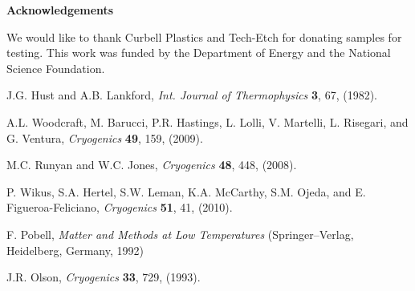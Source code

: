 \documentclass[final]{svjour2}
\begin{document}
\noindent \textbf{Acknowledgements}

\noindent We would like to thank Curbell Plastics and Tech-Etch for donating samples for testing. This work was funded by the Department of Energy and the National Science Foundation.


\vspace{-0.22cm}

\begin{thebibliography}{99}

J.G. Hust and A.B. Lankford, {\it Int. Journal of Thermophysics} \textbf{3}, 67, (1982).

A.L. Woodcraft, M. Barucci, P.R. Hastings, L. Lolli, V. Martelli, L. Risegari, and G. Ventura, {\it Cryogenics} \textbf{49}, 159, (2009).

M.C. Runyan and W.C. Jones, {\it Cryogenics} \textbf{48}, 448, (2008).

P. Wikus, S.A. Hertel, S.W. Leman, K.A. Mc{C}arthy, S.M. Ojeda, and E. Figueroa-{F}eliciano, {\it Cryogenics} \textbf{51}, 41, (2010).

F. Pobell, {\it Matter and Methods at Low Temperatures} (Springer--Verlag, Heidelberg, Germany, 1992)

J.R. Olson, {\it Cryogenics} \textbf{33}, 729, (1993).

\end{thebibliography}
\end{document}
